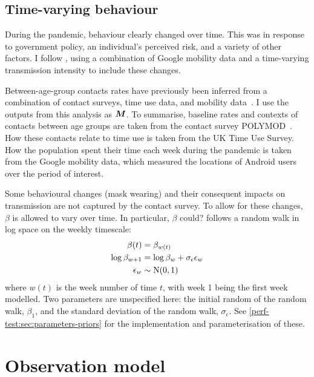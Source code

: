 \documentclass[thesis.tex]{subfiles}
\begin{document}
\subsection{Time-varying behaviour} \label{SEIR:sec:time-varying-foi}

During the pandemic, behaviour clearly changed over time.
This was in response to government policy, an individual's perceived risk, and a variety of other factors.
I follow \textcite{birrellRealtime}, using a combination of Google mobility data and a time-varying transmission intensity to include these changes.

Between-age-group contacts rates have previously been inferred from a combination of contact surveys, time use data, and mobility data~\autocites{vanleeuwenTime}{vanleeuwenAugmenting}.
I use the outputs from this analysis as $\bm{M}$.
To summarise, baseline rates and contexts of contacts between age groups are taken from the contact survey POLYMOD~\autocite{mossongSocial}.
How these contacts relate to time use is taken from the UK Time Use Survey.
How the population spent their time each week during the pandemic is taken from the Google mobility data, which measured the locations of Android users over the period of interest.

Some behavioural changes (\eg mask wearing) and their consequent impacts on transmission are not captured by the contact survey.
To allow for these changes, $\beta$ is allowed to vary over time.
In particular, $\beta$ could? follows a random walk in log space on the weekly timescale:
\begin{align}
    \beta(t) &= \beta_{w(t)} \\
    \log\beta_{w+1} &= \log\beta_w + \sigma_\epsilon \epsilon_w \\
    \epsilon_w &\sim \operatorname{N}(0, 1)
\end{align}
where $w(t)$ is the week number of time $t$, with week 1 being the first week modelled.
Two parameters are unspecified here: the initial random of the random walk, $\beta_1$, and the standard deviation of the random walk, $\sigma_\epsilon$.
See \cref{perf-test:sec:parameters-priors} for the implementation and parameterisation of these.

\section{Observation model} \label{SEIR:sec:observation}
\end{document}
